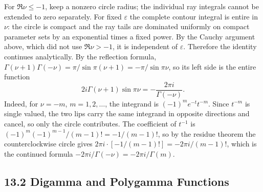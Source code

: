 For $\Re\nu\le-1$, keep a nonzero circle radius; the individual
ray integrals cannot be extended to zero separately.  For fixed
$\varepsilon$ the complete contour integral is entire in $\nu$:
the circle is compact and the ray tails are dominated uniformly on
compact parameter sets by an exponential times a fixed power.
By the Cauchy argument above, which did not use $\Re\nu>-1$, it is
independent of $\varepsilon$.  Therefore the identity continues
analytically.  By the reflection formula,
$\Gamma(\nu+1)\Gamma(-\nu)=\pi/\sin\pi(\nu+1)=-\pi/\sin\pi\nu$, so its
left side is the entire function
\[
2i\Gamma(\nu+1)\sin\pi\nu=-\frac{2\pi i}{\Gamma(-\nu)}.
\]
Indeed, for $\nu=-m$, $m=1,2,\ldots$, the integrand is
$(-1)^m e^{-t}t^{-m}$.  Since $t^{-m}$ is single valued, the two lips
carry the same integrand in opposite directions and cancel, so only
the circle contributes.  The coefficient of $t^{-1}$ is
$(-1)^m(-1)^{m-1}/(m-1)!=-1/(m-1)!$, so by the residue theorem the
counterclockwise circle gives $2\pi i\cdot[-1/(m-1)!]=-2\pi i/(m-1)!$,
which is the continued formula $-2\pi i/\Gamma(-\nu)=-2\pi i/\Gamma(m)$.


\subsection*{13.2 Digamma and Polygamma Functions}

